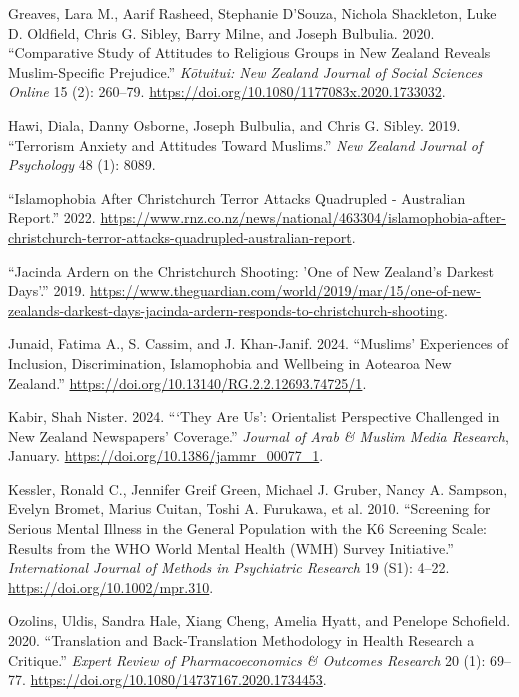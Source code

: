\documentclass[
]{interact}
\newlength{\cslhangindent}
\newenvironment{CSLReferences}[2] %
 {\begin{list}{}{%
  \setlength{\itemindent}{0pt}
  \setlength{\leftmargin}{0pt}
  \setlength{\parsep}{0pt}
  \ifodd #1
   \setlength{\leftmargin}{\cslhangindent}
   \setlength{\itemindent}{-1\cslhangindent}
  \fi
  \setlength{\itemsep}{#2\baselineskip}}}
 {\end{list}}
\begin{document}
\begin{CSLReferences}{1}{0}
Greaves, Lara M., Aarif Rasheed, Stephanie D'Souza, Nichola Shackleton,
Luke D. Oldfield, Chris G. Sibley, Barry Milne, and Joseph Bulbulia.
2020. {``Comparative Study of Attitudes to Religious Groups in New
Zealand Reveals Muslim-Specific Prejudice.''} \emph{K{ō}tuitui: New
Zealand Journal of Social Sciences Online} 15 (2): 260--79.
\url{https://doi.org/10.1080/1177083x.2020.1733032}.

Hawi, Diala, Danny Osborne, Joseph Bulbulia, and Chris G. Sibley. 2019.
{``Terrorism Anxiety and Attitudes Toward Muslims.''} \emph{New Zealand
Journal of Psychology} 48 (1): 8089.

{``Islamophobia After {C}hristchurch Terror Attacks Quadrupled -
{A}ustralian Report.''} 2022.
\url{https://www.rnz.co.nz/news/national/463304/islamophobia-after-christchurch-terror-attacks-quadrupled-australian-report}.

{``Jacinda {A}rdern on the {C}hristchurch Shooting: 'One of {N}ew
{Z}ealand's Darkest Days'.''} 2019.
\url{https://www.theguardian.com/world/2019/mar/15/one-of-new-zealands-darkest-days-jacinda-ardern-responds-to-christchurch-shooting}.

Junaid, Fatima A., S. Cassim, and J. Khan-Janif. 2024. {``Muslims'
Experiences of Inclusion, Discrimination, {I}slamophobia and Wellbeing
in {A}otearoa {N}ew {Z}ealand.''}
\url{https://doi.org/10.13140/RG.2.2.12693.74725/1}.

Kabir, Shah Nister. 2024. {``{`}They Are Us{'}: Orientalist Perspective
Challenged in New Zealand Newspapers{'} Coverage.''} \emph{Journal of
Arab \& Muslim Media Research}, January.
\url{https://doi.org/10.1386/jammr_00077_1}.

Kessler, Ronald C., Jennifer Greif Green, Michael J. Gruber, Nancy A.
Sampson, Evelyn Bromet, Marius Cuitan, Toshi A. Furukawa, et al. 2010.
{``Screening for Serious Mental Illness in the General Population with
the K6 Screening Scale: Results from the WHO World Mental Health (WMH)
Survey Initiative.''} \emph{International Journal of Methods in
Psychiatric Research} 19 (S1): 4--22.
\url{https://doi.org/10.1002/mpr.310}.

Ozolins, Uldis, Sandra Hale, Xiang Cheng, Amelia Hyatt, and Penelope
Schofield. 2020. {``Translation and Back-Translation Methodology in
Health Research {\textendash} a Critique.''} \emph{Expert Review of
Pharmacoeconomics \& Outcomes Research} 20 (1): 69--77.
\url{https://doi.org/10.1080/14737167.2020.1734453}.


\end{CSLReferences}
\end{document}

